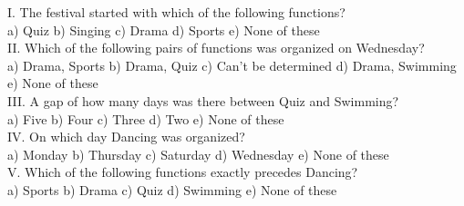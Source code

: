 \documentclass[
]{article}
\begin{document}
I. The festival started with which of the following functions?\\
a) Quiz \hspace{2mm}b) Singing \hspace{2mm}c) Drama \hspace{2mm}d) Sports \hspace{2mm}e) None of these\\

II. Which of the following pairs of functions was organized on Wednesday?\\
a) Drama, Sports \hspace{2mm}b) Drama, Quiz \hspace{2mm}c) Can’t be determined
\hspace{2mm}d) Drama, Swimming \hspace{2mm}e) None of these\\

III. A gap of how many days was there between Quiz and Swimming?\\
a) Five \hspace{2mm}b) Four \hspace{2mm}c) Three \hspace{2mm}d) Two \hspace{2mm}e) None of these\\

IV. On which day Dancing was organized?\\
a) Monday \hspace{2mm}b) Thursday \hspace{2mm}c) Saturday
\hspace{2mm}d) Wednesday \hspace{2mm}e) None of these\\

V. Which of the following functions exactly precedes Dancing?\\
a) Sports \hspace{2mm}b) Drama \hspace{2mm}c) Quiz \hspace{2mm}d) Swimming \hspace{2mm}e) None of these\\
\end{document}
